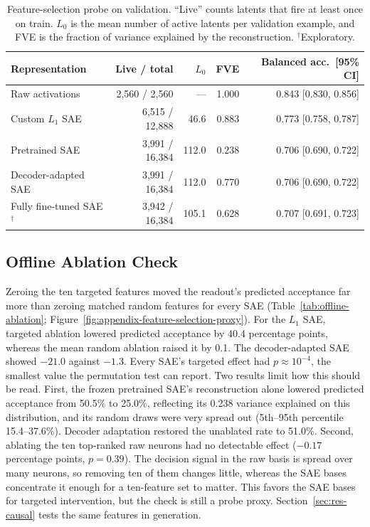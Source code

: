 \begin{table}[htbp]
    \centering
    \caption{Feature-selection probe on validation. ``Live'' counts latents
    that fire at least once on train. $L_0$ is the mean number of active
    latents per validation example, and FVE is the fraction of variance
    explained by the reconstruction. $^\dagger$Exploratory.}
    \label{tab:probe-performance}
    \begin{tabular}{lrrrr}
        \toprule
        Representation & Live / total & $L_0$ & FVE & Balanced acc.\ [95\% CI] \\
        \midrule
        Raw activations & 2,560 / 2,560 & --- & 1.000 & 0.843 [0.830, 0.856] \\
        Custom $L_1$ SAE & 6,515 / 12,888 & 46.6 & 0.883 & 0.773 [0.758, 0.787] \\
        Pretrained SAE & 3,991 / 16,384 & 112.0 & 0.238 & 0.706 [0.690, 0.722] \\
        Decoder-adapted SAE & 3,991 / 16,384 & 112.0 & 0.770 & 0.706 [0.690, 0.722] \\
        Fully fine-tuned SAE$^\dagger$ & 3,942 / 16,384 & 105.1 & 0.628 & 0.707 [0.691, 0.723] \\
        \bottomrule
    \end{tabular}
\end{table}

\subsection{Offline Ablation Check}

Zeroing the ten targeted features moved the readout's predicted acceptance
far more than zeroing matched random features for every SAE
(Table~\ref{tab:offline-ablation};
Figure~\ref{fig:appendix-feature-selection-proxy}). For the $L_1$ SAE,
targeted ablation lowered predicted acceptance by 40.4 percentage points,
whereas the mean random ablation raised it by 0.1. The decoder-adapted SAE
showed $-21.0$ against $-1.3$. Every SAE's targeted effect had $p\approx10^{-4}$, the
smallest value the permutation test can report. Two results limit how this
should be read. First, the frozen pretrained SAE's reconstruction alone
lowered predicted acceptance from 50.5\% to 25.0\%, reflecting its 0.238
variance explained on this distribution, and its random draws were very
spread out (5th--95th percentile 15.4--37.6\%). Decoder adaptation restored
the unablated rate to 51.0\%. Second, ablating the ten top-ranked raw neurons
had no detectable effect ($-0.17$ percentage points, $p=0.39$). The decision
signal in the raw basis is spread over many neurons, so removing ten of them
changes little, whereas the SAE bases concentrate it enough for a ten-feature
set to matter. This favors the SAE bases for targeted intervention, but the check
is still a probe proxy. Section~\ref{sec:res-causal} tests the same features
in generation.

